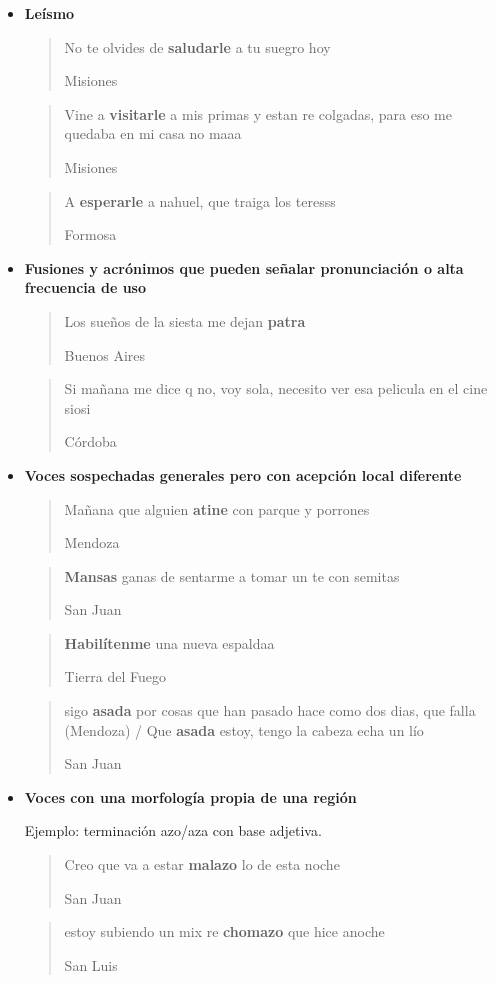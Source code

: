 \begin{itemize}
  \blockquote[Jujuy]{Me encantan los bohemios anti sistema que usan vans. Es como que seas ecologista y uses un cuaderno hecho con media \textbf{yunga}.}

\item \textbf{Leísmo}

  \blockquote[Misiones]{No te olvides de \textbf{saludarle} a tu suegro hoy}

  \blockquote[Misiones]{Vine a \textbf{visitarle} a mis primas y estan re colgadas, para eso me quedaba en mi casa no maaa }

  \blockquote[Formosa]{A \textbf{esperarle} a nahuel, que traiga los teresss }

\item \textbf{Fusiones y acrónimos que pueden señalar pronunciación o alta frecuencia de uso}

  \blockquote[Buenos Aires]{Los sueños de la siesta me dejan \textbf{patra} }

  \blockquote[Córdoba]{Si mañana me dice q no, voy sola, necesito ver esa pelicula en el cine siosi}


\item \textbf{Voces sospechadas generales pero con acepción local diferente}

  \blockquote[Mendoza]{Mañana que alguien \textbf{atine} con parque y porrones}

  \blockquote[San Juan]{\textbf{Mansas} ganas de sentarme a tomar un te con semitas}

  \blockquote[Tierra del Fuego]{\textbf{Habilítenme} una nueva espaldaa}

  \blockquote[San Juan]{sigo \textbf{asada} por cosas que han pasado hace como dos dias, que falla (Mendoza) / Que \textbf{asada} estoy, tengo la cabeza echa un lío}


\item \textbf{Voces con una morfología propia de una región}

Ejemplo: terminación azo/aza con base adjetiva.

  \blockquote[San Juan]{Creo que va a estar \textbf{malazo} lo de esta noche } 

  \blockquote[San Luis]{estoy subiendo un mix re \textbf{chomazo} que hice anoche }


\end{itemize}
